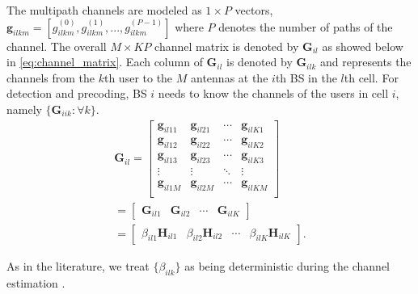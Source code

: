 \documentclass[10pt,journal,comsoc,final]{IEEEtran}
\begin{document}
The multipath channels are modeled as $1 \times P$ vectors, $\textbf{g}_{ilkm} = \left[ g_{ilkm}^{(0)}, g_{ilkm}^{(1)}, ..., g_{ilkm}^{(P-1)} \right]$ where $P$ denotes the number of paths of the channel. The overall $M \times KP$ channel matrix is denoted by $\textbf{G}_{il}$ as showed below in \eqref{eq:channel_matrix}. Each column of $\textbf{G}_{il}$ is denoted by $\textbf{G}_{ilk}$ and represents the channels from the $k$th user to the $M$ antennas at the $i$th BS in the $l$th cell. For detection and precoding, BS $i$ needs to know the channels of the users in cell $i$, namely $\{ \textbf{G}_{iik} : \forall k \}$.
\begin{equation}\label{eq:channel_matrix}
\begin{split}
\textbf{G}_{il} = \left[\begin{array}{cccc}
\textbf{g}_{il11} & \textbf{g}_{il21} & \cdots & \textbf{g}_{ilK1} \\
\textbf{g}_{il12} & \textbf{g}_{il22} & \cdots & \textbf{g}_{ilK2} \\
\textbf{g}_{il13} & \textbf{g}_{il23} & \cdots & \textbf{g}_{ilK3} \\
\vdots & \vdots & \ddots & \vdots \\
\textbf{g}_{il1M} & \textbf{g}_{il2M} & \cdots & \textbf{g}_{ilKM} \\ \end{array} \right] \\ = \left[\begin{array}{cccc}
\textbf{G}_{il1} & \textbf{G}_{il2} & \cdots & \textbf{G}_{ilK} \end{array} \right] \hspace{10pt} \\ = \left[\begin{array}{cccc}
\beta_{il1}\textbf{H}_{il1} & \beta_{il2}\textbf{H}_{il2} & \cdots & \beta_{ilK}\textbf{H}_{ilK} \end{array} \right].
\end{split}
\end{equation}

As in the literature, we treat $\lbrace \beta_{ilk} \rbrace$ as being deterministic during the channel estimation  \cite{marzetta:noncooperative, Ashikhmi:interference_reduction, Bjornson:LowComplexityPolynomial, Amin:channelEstPilotCont}.

\end{document}
